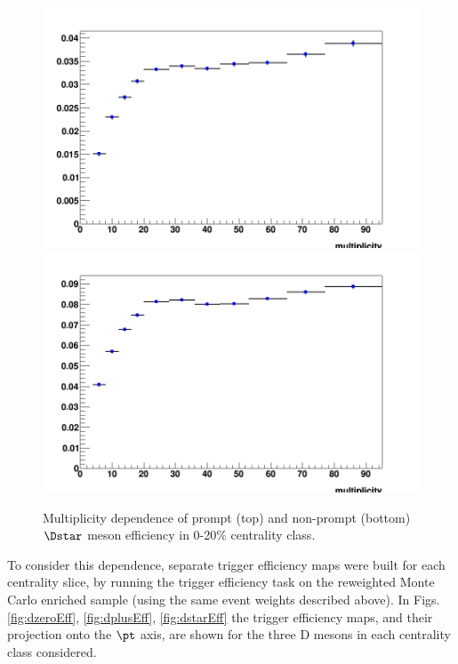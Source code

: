 \begin{figure}[!htp]
	\centering
    \includegraphics[width=.48\linewidth]{figuresVsCent/Global/EfficiencyMap_1D_DStar_c_020_ZNA_vsMult_wLimAcc_Plot.png}
\includegraphics[width=.48\linewidth]{figuresVsCent/Global/EfficiencyMap_1D_DStar_b_020_ZNA_vsMult_wLimAcc_Plot.png}
\caption{Multiplicity dependence of prompt (top) and non-prompt (bottom) $\Dstar$ meson efficiency in 0-20$\%$ centrality class.}
	\label{fig:dEffvsMult}	
\end{figure}

To consider this dependence, separate trigger efficiency maps were built for each centrality slice, by running the trigger efficiency task on the reweighted Monte Carlo enriched sample (using the same event weights described above).
In Figs. \ref{fig:dzeroEff}, \ref{fig:dplusEff}, \ref{fig:dstarEff} the trigger efficiency maps, and their projection onto the $\pt$ axis, are shown for the three D mesons in each centrality class considered.

